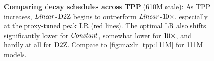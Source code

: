 \begin{figure}
  \centering
  \mbox{}
  \vspace{-1mm}
  \mbox{}
  \caption{\textbf{Comparing decay schedules across TPP} (610M
    scale):
    As TPP increases, $\mbox{\emph{Linear}}$-$\mbox{D2Z}$ begins to outperform
    $\mbox{\emph{Linear}}$-$\mbox{10}\times$, especially at the proxy-tuned peak LR (red
    lines).  The optimal LR also shifts significantly lower for
    $\mbox{\emph{Constant}}$, somewhat lower for $\mbox{10}\times$, and hardly at all for
    $\mbox{D2Z}$.  Compare to \cref{fig:maxlr_tpp:111M} for 111M
    models.\label{fig:maxlr_tpp:610M}}
\end{figure}
